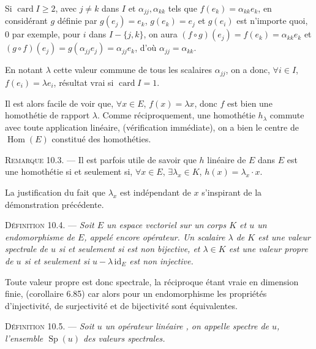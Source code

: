 Si $\operatorname{card}I\ge2$, avec $j\ne k$ dans $I$ et $\alpha_{jj},\alpha_{kk}$ tels que $f(e_k)=\alpha_{kk}e_k$, en considérant $g$ définie par $g(e_j)=e_k$, $g(e_k)=e_j$ et $g(e_i)$ est n'importe quoi, 0 par exemple, pour $i$ dans $I-\{j,k\}$, on aura $(f\circ g)(e_j)=f(e_k)=\alpha_{kk}e_k$ et $(g\circ f)(e_j)=g(\alpha_{jj}e_j)=\alpha_{jj}e_k$, d'où $\alpha_{jj}=\alpha_{kk}$.

En notant $\lambda$ cette valeur commune de tous les scalaires $\alpha_{jj}$, on a donc, $\forall i\in I$, $f(e_i)=\lambda e_i$, résultat vrai si $\operatorname{card}I=1$.

Il est alors facile de voir que, $\forall x\in E$, $f(x)=\lambda x$, donc $f$ est bien une homothétie de rapport $\lambda$. Comme réciproquement, une homothétie $h_\lambda$ commute avec toute application linéaire, (vérification immédiate), on a bien le centre de $\operatorname{Hom}(E)$ constitué des homothéties. \bookend

\medskip\noindent\textsc{Remarque 10.3.} --- Il est parfois utile de savoir que $h$ linéaire de $E$ dans $E$ est une homothétie si et seulement si, $\forall x\in E$, $\exists\lambda_x\in K$, $h(x)=\lambda_x\cdot x$.

La justification du fait que $\lambda_x$ est indépendant de $x$ s'inspirant de la démonstration précédente.


\medskip\noindent\textsc{Définition 10.4.} --- \emph{Soit $E$ un espace vectoriel sur un corps $K$ et $u$ un endomorphisme de $E$, appelé encore opérateur. Un scalaire $\lambda$ de $K$ est une valeur spectrale de $u$ si et seulement si  est non bijective, et $\lambda\in K$ est une valeur propre de $u$ si et seulement si $u-\lambda\,\mathrm{id}_E$ est non injective.}

Toute valeur propre est donc spectrale, la réciproque étant vraie en dimension finie, (corollaire 6.85) car alors pour un endomorphisme les propriétés d'injectivité, de surjectivité et de bijectivité sont équivalentes.

\medskip\noindent\textsc{Définition 10.5.} --- \emph{Soit $u$ un opérateur linéaire , on appelle spectre de $u$, l'ensemble $\operatorname{Sp}(u)$ des valeurs spectrales.}

